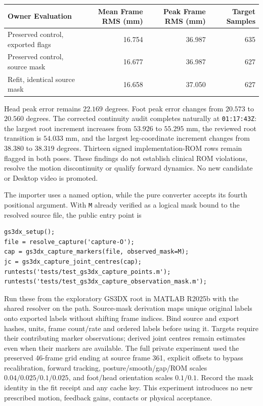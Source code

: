 \documentclass[11pt,a4paper]{article}
\begin{document}
\begin{center}
\begin{tabular}{lrrr}
\toprule
Owner Evaluation & Mean Frame RMS (mm) & Peak Frame RMS (mm) & Target Samples\\
\midrule
Preserved control, exported flags & 16.754 & 36.987 & 635\\
Preserved control, source mask & 16.677 & 36.987 & 627\\
Refit, identical source mask & 16.658 & 37.050 & 627\\
\bottomrule
\end{tabular}
\end{center}
Head peak error remains $22.169$ degrees. Foot peak error changes from
$20.573$ to $20.560$ degrees. The corrected continuity audit completes
naturally at \texttt{01:17:43Z}: the largest root increment increases
from $53.926$ to $55.295$ mm, the reviewed root transition is $54.033$ mm,
and the largest leg-coordinate increment changes from $38.380$ to
$38.319$ degrees. Thirteen signed implementation-ROM rows remain flagged
in both poses. These findings do not establish clinical ROM violations,
resolve the motion discontinuity or qualify forward dynamics. No new
candidate or Desktop video is promoted.

The importer uses a named option, while the pure converter accepts its
fourth positional argument. With \texttt{M} already verified as a logical
mask bound to the resolved source file, the public entry point is
\begin{verbatim}
gs3dx_setup();
file = resolve_capture('capture-O');
cap = gs3dx_capture_markers(file, observed_mask=M);
jc = gs3dx_capture_joint_centres(cap);
runtests('tests/test_gs3dx_capture_points.m');
runtests('tests/test_gs3dx_capture_observation_mask.m');
\end{verbatim}
Run these from the exploratory GS3DX root in MATLAB R2025b with the
shared resolver on the path. Source-mask derivation maps unique original
labels onto exported labels without shifting frame indices. Bind source
and export hashes, units, frame count/rate and ordered labels before
using it. Targets require their contributing marker observations;
derived joint centres remain estimates even when their markers are
available. The full private experiment used the preserved 46-frame grid
ending at source frame 361, explicit offsets to bypass recalibration,
forward tracking, posture/smooth/gap/ROM scales $0.04/0.025/0.1/0.025$,
and foot/head orientation scales $0.1/0.1$. Record the mask identity in
the fit receipt and any cache key. This experiment introduces no new
prescribed motion, feedback gains, contacts or physical acceptance.
\end{document}
